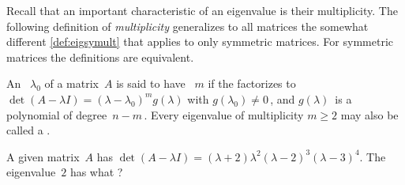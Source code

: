 Recall that an important characteristic of an eigenvalue is their multiplicity.
The following definition of \emph{multiplicity} generalizes to all matrices the somewhat different \autoref{def:eigsymult} that applies to only symmetric matrices.
For symmetric matrices the definitions are equivalent.


\begin{definition} \label{def:eigmult}
An ~\(\lambda_0\) of a matrix~\(A\) is said to have ~\(m\) if the  factorizes to \(\det(A-\lambda I)=(\lambda-\lambda_0)^mg(\lambda)\) with \(g(\lambda_0)\neq0\)\,, and \(g(\lambda)\)~is a polynomial of degree~\(n-m\)\,.
Every eigenvalue of multiplicity \(m\geq2\) may also be called a .
\end{definition}



\begin{activity}
A given matrix~\(A\) has  \(\det(A-\lambda I)=(\lambda+2)\lambda^2(\lambda-2)^3(\lambda-3)^4\).
The eigenvalue~\(2\) has what ?
\end{activity}



